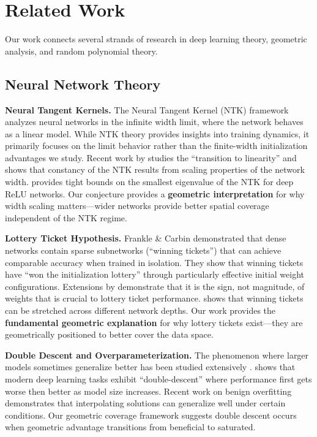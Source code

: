 \section{Related Work}
\label{sec:related_work}

Our work connects several strands of research in deep learning theory, geometric analysis, and random polynomial theory.

\subsection{Neural Network Theory}

\textbf{Neural Tangent Kernels.} The Neural Tangent Kernel (NTK) framework \cite{Jacot2018NeuralTK} analyzes neural networks in the infinite width limit, where the network behaves as a linear model. While NTK theory provides insights into training dynamics, it primarily focuses on the limit behavior rather than the finite-width initialization advantages we study. Recent work by \cite{Liu2020OnThe} studies the ``transition to linearity'' and shows that constancy of the NTK results from scaling properties of the network width. \cite{Nguyen2021TightBounds} provides tight bounds on the smallest eigenvalue of the NTK for deep ReLU networks. Our conjecture provides a \textbf{geometric interpretation} for why width scaling matters---wider networks provide better spatial coverage independent of the NTK regime.

\textbf{Lottery Ticket Hypothesis.} Frankle \& Carbin \cite{Frankle2018TheLT} demonstrated that dense networks contain sparse subnetworks (``winning tickets'') that can achieve comparable accuracy when trained in isolation. They show that winning tickets have ``won the initialization lottery'' through particularly effective initial weight configurations. Extensions by \cite{Zhou2019DeconstructingLT} demonstrate that it is the sign, not magnitude, of weights that is crucial to lottery ticket performance. \cite{Chen2021TheEL} shows that winning tickets can be stretched across different network depths. Our work provides the \textbf{fundamental geometric explanation} for why lottery tickets exist---they are geometrically positioned to better cover the data space.

\textbf{Double Descent and Overparameterization.} The phenomenon where larger models sometimes generalize better has been studied extensively \cite{Belkin2018ReconcilingMM}. \cite{Nakkiran2019DeepDD} shows that modern deep learning tasks exhibit ``double-descent'' where performance first gets worse then better as model size increases. Recent work on benign overfitting \cite{BartlettBenignOverfitting} demonstrates that interpolating solutions can generalize well under certain conditions. Our geometric coverage framework suggests double descent occurs when geometric advantage transitions from beneficial to saturated.


